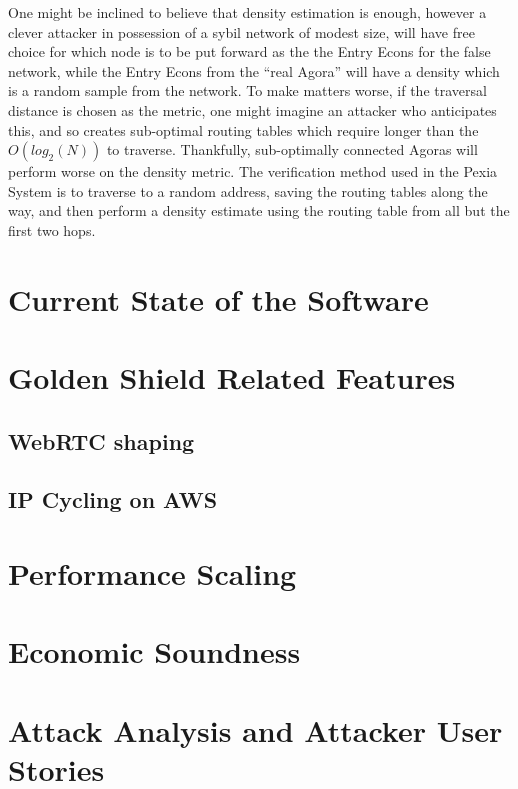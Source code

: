 \documentclass{article}
\newcommand{\mesh}{Pexia}
\begin{document}
One might be inclined to believe that density estimation is enough, however a clever attacker in possession of a sybil network of modest size, will have free choice for which node is to be put forward as the the Entry Econs for the false network, while the Entry Econs from the ``real Agora'' will have a density which is a random sample from the network. To make matters worse, if the traversal distance is chosen as the metric, one might imagine an attacker who anticipates this, and so creates sub-optimal routing tables which require longer than the $O(log_2(N))$ to traverse. Thankfully, sub-optimally connected Agoras will perform worse on the density metric. The verification method used in the \mesh{} System is to traverse to a random address, saving the routing tables along the way, and then perform a density estimate using the routing table from all but the first two hops.


\section{Current State of the Software}
\label{sec:current}


\section{Golden Shield Related Features}
\label{sec:evasion}

\subsection{WebRTC shaping}

\subsection{IP Cycling on AWS}


\section{Performance Scaling}
\label{sec:performance}


\section{Economic Soundness}
\label{sec:economic-soundness}


\section{Attack Analysis and Attacker User Stories}
\label{sec:attack-stories}
\end{document}

